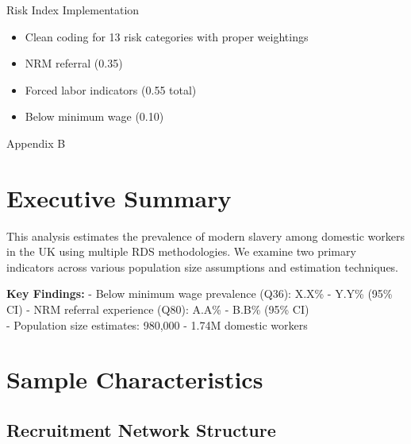 \documentclass[
  12pt,
  letterpaper,
  DIV=11,
  numbers=noendperiod]{scrartcl}
\providecommand{\tightlist}{%
  \setlength{\itemsep}{0pt}\setlength{\parskip}{0pt}}
\theoremstyle{plain}
\theoremstyle{definition}
\begin{document}
Risk Index Implementation

\begin{itemize}
\tightlist
\item
  Clean coding for 13 risk categories with proper weightings
\item
  NRM referral (0.35)
\item
  Forced labor indicators (0.55 total)
\item
  Below minimum wage (0.10)
\end{itemize}

Appendix B

\section{Executive Summary}\label{executive-summary}

This analysis estimates the prevalence of modern slavery among domestic
workers in the UK using multiple RDS methodologies. We examine two
primary indicators across various population size assumptions and
estimation techniques.

\textbf{Key Findings:} - Below minimum wage prevalence (Q36): X.X\% -
Y.Y\% (95\% CI) - NRM referral experience (Q80): A.A\% - B.B\% (95\%
CI)\\
- Population size estimates: 980,000 - 1.74M domestic workers

\section{Sample Characteristics}\label{sample-characteristics}

\subsection{Recruitment Network
Structure}\label{recruitment-network-structure}
\end{document}
